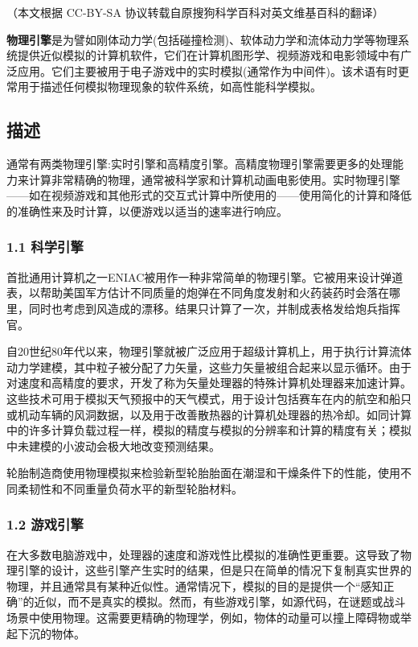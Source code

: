 
（本文根据 CC-BY-SA 协议转载自原搜狗科学百科对英文维基百科的翻译）

\textbf{物理引擎}是为譬如刚体动力学(包括碰撞检测)、软体动力学和流体动力学等物理系统提供近似模拟的计算机软件，它们在计算机图形学、视频游戏和电影领域中有广泛应用。它们主要被用于电子游戏中的实时模拟(通常作为中间件)。该术语有时更常用于描述任何模拟物理现象的软件系统，如高性能科学模拟。

\subsection{描述}
通常有两类物理引擎:实时引擎和高精度引擎。高精度物理引擎需要更多的处理能力来计算非常精确的物理，通常被科学家和计算机动画电影使用。实时物理引擎——如在视频游戏和其他形式的交互式计算中所使用的——使用简化的计算和降低的准确性来及时计算，以便游戏以适当的速率进行响应。
\subsubsection{1.1 科学引擎}
首批通用计算机之一ENIAC被用作一种非常简单的物理引擎。它被用来设计弹道表，以帮助美国军方估计不同质量的炮弹在不同角度发射和火药装药时会落在哪里，同时也考虑到风造成的漂移。结果只计算了一次，并制成表格发给炮兵指挥官。

自20世纪80年代以来，物理引擎就被广泛应用于超级计算机上，用于执行计算流体动力学建模，其中粒子被分配了力矢量，这些力矢量被组合起来以显示循环。由于对速度和高精度的要求，开发了称为矢量处理器的特殊计算机处理器来加速计算。这些技术可用于模拟天气预报中的天气模式，用于设计包括赛车在内的航空和船只或机动车辆的风洞数据，以及用于改善散热器的计算机处理器的热冷却。如同计算中的许多计算负载过程一样，模拟的精度与模拟的分辨率和计算的精度有关；模拟中未建模的小波动会极大地改变预测结果。

轮胎制造商使用物理模拟来检验新型轮胎胎面在潮湿和干燥条件下的性能，使用不同柔韧性和不同重量负荷水平的新型轮胎材料。
\subsubsection{1.2 游戏引擎}
在大多数电脑游戏中，处理器的速度和游戏性比模拟的准确性更重要。这导致了物理引擎的设计，这些引擎产生实时的结果，但是只在简单的情况下复制真实世界的物理，并且通常具有某种近似性。通常情况下，模拟的目的是提供一个“感知正确”的近似，而不是真实的模拟。然而，有些游戏引擎，如源代码，在谜题或战斗场景中使用物理。这需要更精确的物理学，例如，物体的动量可以撞上障碍物或举起下沉的物体。

